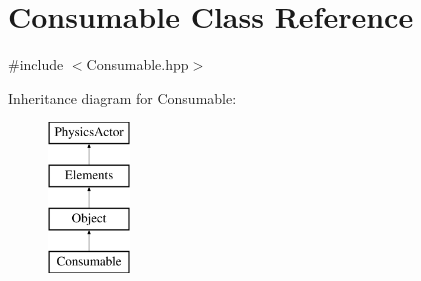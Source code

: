 \hypertarget{class_consumable}{\section{Consumable Class Reference}
\label{class_consumable}
}


{\ttfamily \#include $<$Consumable.\+hpp$>$}

Inheritance diagram for Consumable\+:\begin{figure}[H]
\begin{center}
\leavevmode
\includegraphics[height=4.000000cm]{class_consumable}
\end{center}
\end{figure}
